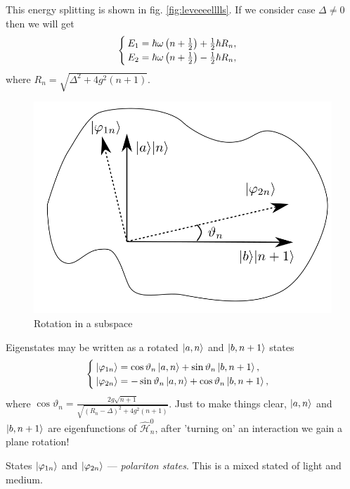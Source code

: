 This energy splitting is shown in fig. \ref{fig:leveeeelllls}. If we consider case $\Delta \neq 0$ then we will get
\begin{equation}
	\begin{cases}
	E_1 = \hbar \omega \left( n + \frac{1}{2} \right) + \frac{1}{2} \hbar R_n, \\
	E_2 = \hbar \omega \left( n + \frac{1}{2} \right) - \frac{1}{2} \hbar R_n,
	\end{cases}
	\label{eq:system57}
\end{equation}
where $R_n = \sqrt{\Delta^2 + 4g^2 (n+1)}$.
\begin{figure}
	\centering
	\includegraphics[width=0.65\linewidth]{fig/L6/rotation}
	\caption{Rotation in a subspace}
	\label{fig:rotation}
\end{figure}

Eigenstates may be written as a rotated $\left\lvert {a,n} \right\rangle$ and $\left\lvert {b,n+1} \right\rangle$ states
\begin{equation}
	\begin{cases}
		\left\lvert {\varphi_{1n}} \right\rangle = \cos \vartheta_n \left\lvert {a, n} \right\rangle + \sin \vartheta_n \left\lvert {b ,n +1} \right\rangle, \\
		\left\lvert {\varphi_{2n}} \right\rangle = -\sin \vartheta_n \left\lvert {a, n} \right\rangle + \cos \vartheta_n \left\lvert {b ,n +1} \right\rangle,
	\end{cases}
\end{equation}
where $\cos \vartheta_n = \frac{2 g \sqrt{n+1}}{\sqrt{(R_n - \Delta)^2 + 4 g^2 (n+1)}}$. Just to make things clear, $\left\lvert {a,n} \right\rangle$ and $\left\lvert {b,n+1} \right\rangle$ are eigenfunctions of $\hat{\mathcal{H}}^0_{n}$, after 'turning on' an interaction we gain a plane rotation!


States $\left\lvert {\varphi_{1n}} \right\rangle$ and $\left\lvert {\varphi_{2n}} \right\rangle$ --- \textit{polariton states}. This is a mixed stated of light and medium.


